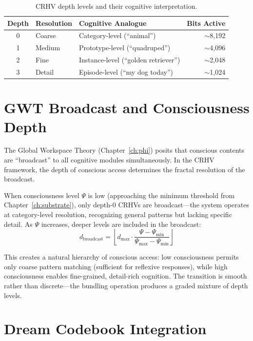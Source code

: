 \documentclass[12pt]{book}
\begin{document}
\begin{table}[htbp]
\centering
\caption{CRHV depth levels and their cognitive interpretation.}
\label{tab:crhv-depths}
\begin{tabular}{@{}cllr@{}}
\toprule
\textbf{Depth} & \textbf{Resolution} & \textbf{Cognitive Analogue} & \textbf{Bits Active} \\
\midrule
0 & Coarse   & Category-level (``animal'')       & $\sim$8,192 \\
1 & Medium   & Prototype-level (``quadruped'')    & $\sim$4,096 \\
2 & Fine     & Instance-level (``golden retriever'') & $\sim$2,048 \\
3 & Detail   & Episode-level (``my dog today'')   & $\sim$1,024 \\
\bottomrule
\end{tabular}
\end{table}

\section{GWT Broadcast and Consciousness Depth}

The Global Workspace Theory (Chapter~\ref{ch:phi}) posits that conscious contents are ``broadcast'' to all cognitive modules simultaneously. In the CRHV framework, the depth of conscious access determines the fractal resolution of the broadcast.

When consciousness level $\Psi$ is low (approaching the minimum threshold from Chapter~\ref{ch:substrate}), only depth-0 CRHVs are broadcast---the system operates at category-level resolution, recognizing general patterns but lacking specific detail. As $\Psi$ increases, deeper levels are included in the broadcast:
\begin{equation}
d_{\text{broadcast}} = \left\lfloor d_{\max} \cdot \frac{\Psi - \Psi_{\min}}{\Psi_{\max} - \Psi_{\min}} \right\rfloor
\end{equation}

This creates a natural hierarchy of conscious access: low consciousness permits only coarse pattern matching (sufficient for reflexive responses), while high consciousness enables fine-grained, detail-rich cognition. The transition is smooth rather than discrete---the bundling operation produces a graded mixture of depth levels.

\section{Dream Codebook Integration}
\end{document}
